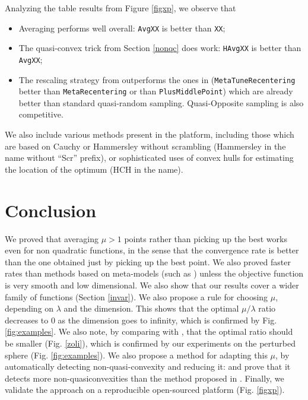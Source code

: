 Analyzing the table results from Figure \ref{figxp}, we observe that
\begin{itemize}
\item Averaging performs well overall: \texttt{AvgXX} is better than \texttt{XX};
\item The quasi-convex trick from Section \ref{nonqc} does work: \texttt{HAvgXX} is better than \texttt{AvgXX};
\item The rescaling strategy from \cite{ppsnrescaling} outperforms the ones in \cite{icmldoe} 
 (\texttt{MetaTuneRecentering} better than \texttt{MetaRecentering} or than \texttt{PlusMiddlePoint}) which are already better than standard quasi-random sampling. Quasi-Opposite sampling is also competitive.
 \end{itemize}
 We also include various methods present in the platform, including those which are based on Cauchy or Hammersley without scrambling (Hammersley in the name without ``Scr'' prefix), or sophisticated uses of convex hulls for estimating the location of the optimum (HCH in the name).


\section{Conclusion}
We proved that averaging $\mu>1$ points rather than picking up the best works even for non quadratic functions, in the sense that the convergence rate is better than the one obtained just by picking up the best point. We also proved faster rates than methods based on meta-models (such as \cite{bach}) unless the objective function is very smooth and low dimensional. {We also show that our results cover a wider family of functions (Section \ref{invar}).}
{We also propose a rule for choosing $\mu$, depending on $\lambda$ and the dimension. This shows that the optimal $\mu/\lambda$ ratio decreases to $0$ as the dimension goes to infinity, which is confirmed by Fig. \ref{fig:examples}. We also note, by comparing with \cite{ppsnkbest}, that the optimal ratio should be smaller (Fig. \ref{zoli}), which is confirmed by our experiments on the perturbed sphere (Fig. \ref{fig:examples}).
We also propose a method for adapting this $\mu$, by automatically detecting non-quasi-convexity and reducing it: and prove that it detects more non-quasiconvexities than the method proposed in \cite{ppsnkbest}. Finally, we validate the approach on a reproducible open-sourced platform (Fig. \ref{figxp}).}

